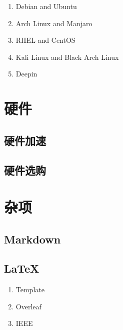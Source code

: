 \documentclass[a4paper]{article}
\begin{document}
\begin{enumerate}[leftmargin=2cm,  itemindent=1cm]
    \item Debian and Ubuntu
    \item Arch Linux and Manjaro
    \item RHEL and CentOS
    \item Kali Linux and Black Arch Linux
    \item Deepin
\end{enumerate}

\section{\LARGE 硬件}

\subsection{\LARGE 硬件加速}

\subsection{\LARGE 硬件选购}

\section{\LARGE 杂项}

\subsection{\LARGE Markdown}

\subsection{\LARGE LaTeX}

\begin{enumerate}[leftmargin=2cm,  itemindent=1cm]
    \item Template
    \item Overleaf
    \item IEEE
\end{enumerate}
\end{document}
